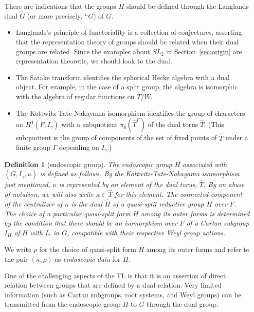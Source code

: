 \documentclass[brochure,english,12pt]{bourbaki}
\newtheorem{definition}[equation]{Definition}
\begin{document}
There are indications that the groups $H$ should be defined through  
the Langlands dual $\hat G$ (or more precisely, ${}^LG$) of $G$.
\begin{itemize}
\item Langlands's principle of functoriality is a collection of
  conjectures, asserting that the representation theory of groups
  should be related when their dual groups are related.  Since the
  examples about $SL_2$ in Section~\ref{sec:origin} are representation
  theoretic, we should look to the dual.
\item The Satake transform identifies the spherical Hecke algebra with
  a dual object.  For example, in the case of a split group, the
  algebra is isomorphic with the algebra of regular functions on $\hat
  T/W$.
\item The Kottwitz-Tate-Nakayama isomorphism identifies the group of
  characters on $H^1(F,I_\gamma)$ with a subquotient $\pi_0(\hat T^\Gamma)$
  of the dual torus $\hat T$.  (This subquotient is the group of
  components of the set of fixed points of $\hat T$ under a finite
  group $\Gamma$ depending on $I_\gamma$.)
\end{itemize}

\begin{definition}[endoscopic group]
  The {\it endoscopic group} $H$ associated with $(G,I_\gamma,\kappa)$ is defined
  as follows.  By the Kottwitz-Tate-Nakayama isomorphism just
  mentioned, $\kappa$ is represented by an element of the dual torus,
  $\hat T$.  By an abuse of notation, we will also write $\kappa\in
  \hat T$ for this element.  The connected component of the
  centralizer of $\kappa$ is the dual $\hat H$ of a quasi-split
  reductive group $H$ over $F$.  The choice of a particular quasi-split form $H$
  among its outer forms is determined by the condition that there should
  be an isomorphism over $F$ of a Cartan subgroup $I_H$ of $H$ with
  $I_\gamma$ in $G$, compatible with their respective Weyl group actions.
\end{definition}

We write $\rho$ for the choice of quasi-split form $H$ among its outer forms and refer to
the pair $(\kappa,\rho)$ as {\it endoscopic data} for $H$.

One of the challenging aspects of the FL is that it is an assertion of
direct relation between groups that are defined by a dual
relation.  Very limited information (such as
Cartan subgroups, root systems, and Weyl groups) can be transmitted
from the endoscopic group $H$ to $G$ through the dual group.
\end{document}
